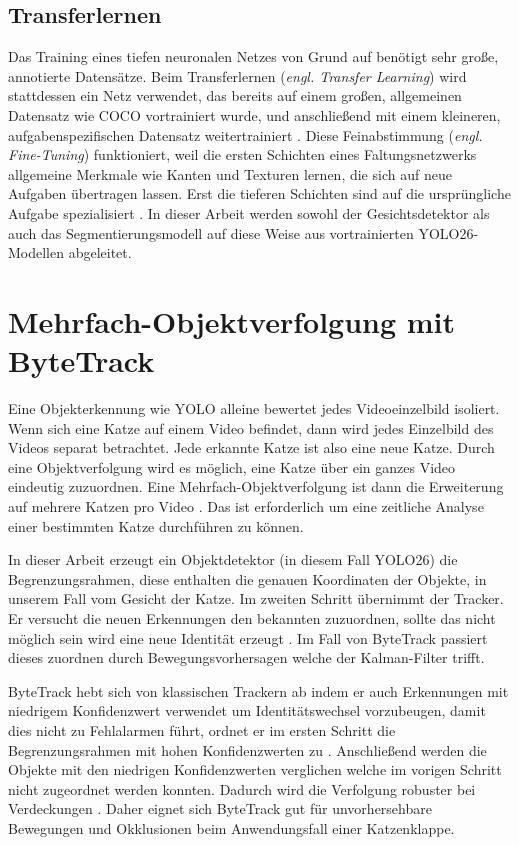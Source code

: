 \subsection{Transferlernen}
\label{subsec:transfer}
Das Training eines tiefen neuronalen Netzes von Grund auf benötigt sehr große, annotierte Datensätze. Beim Transferlernen (\emph{engl. Transfer Learning}) wird stattdessen ein Netz verwendet, das bereits auf einem großen, allgemeinen Datensatz wie COCO \cite{lin2014coco} vortrainiert wurde, und anschließend mit einem kleineren, aufgabenspezifischen Datensatz weitertrainiert \cite{pan2010transfer}. Diese Feinabstimmung (\emph{engl. Fine-Tuning}) funktioniert, weil die ersten Schichten eines Faltungsnetzwerks allgemeine Merkmale wie Kanten und Texturen lernen, die sich auf neue Aufgaben übertragen lassen. Erst die tieferen Schichten sind auf die ursprüngliche Aufgabe spezialisiert \cite{yosinski2014transferable}. In dieser Arbeit werden sowohl der Gesichtsdetektor als auch das Segmentierungsmodell auf diese Weise aus vortrainierten YOLO26-Modellen abgeleitet.

\section{Mehrfach-Objektverfolgung mit ByteTrack}
\label{subsec:bytetrack}

Eine Objekterkennung wie YOLO alleine bewertet jedes Videoeinzelbild isoliert. Wenn sich eine Katze auf einem Video befindet, dann wird jedes Einzelbild des Videos separat betrachtet. Jede erkannte Katze ist also eine neue Katze. Durch eine Objektverfolgung wird es möglich, eine Katze über ein ganzes Video eindeutig zuzuordnen. Eine Mehrfach-Objektverfolgung ist dann die Erweiterung auf mehrere Katzen pro Video \cite{luo2021mot}. Das ist erforderlich um eine zeitliche Analyse einer bestimmten Katze durchführen zu können.

In dieser Arbeit erzeugt ein Objektdetektor (in diesem Fall YOLO26) die Begrenzungsrahmen, diese enthalten die genauen Koordinaten der Objekte, in unserem Fall vom Gesicht der Katze. Im zweiten Schritt übernimmt der Tracker. Er versucht die neuen Erkennungen den bekannten zuzuordnen, sollte das nicht möglich sein wird eine neue Identität erzeugt \cite{bewley2016sort, kuhn1955hungarian}. Im Fall von ByteTrack \cite{zhang2022bytetrack} passiert dieses zuordnen durch Bewegungsvorhersagen welche der Kalman-Filter \cite{kalman1960new} trifft.

ByteTrack hebt sich von klassischen Trackern \cite{bewley2016sort, wojke2017deepsort} ab indem er auch Erkennungen mit niedrigem Konfidenzwert verwendet um Identitätswechsel vorzubeugen, damit dies nicht zu Fehlalarmen führt, ordnet er im ersten Schritt die Begrenzungsrahmen mit hohen Konfidenzwerten zu \cite{zhang2022bytetrack}. Anschließend werden die Objekte mit den niedrigen Konfidenzwerten verglichen welche im vorigen Schritt nicht zugeordnet werden konnten. Dadurch wird die Verfolgung robuster bei Verdeckungen \cite{zhang2022bytetrack}. Daher eignet sich ByteTrack gut für unvorhersehbare Bewegungen und Okklusionen beim Anwendungsfall einer Katzenklappe.

